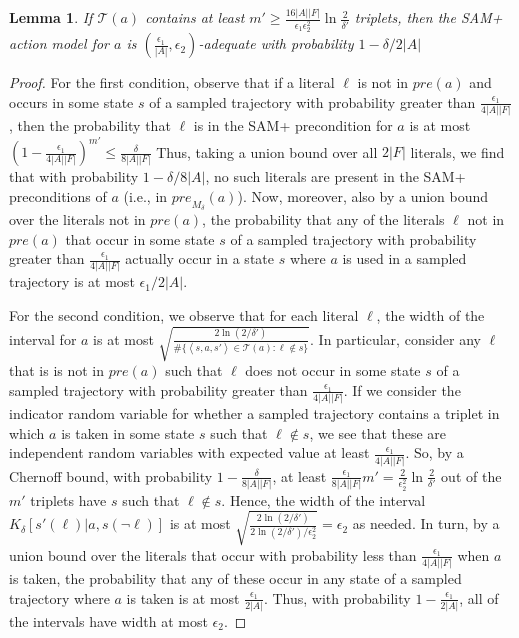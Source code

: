 \documentclass[letterpaper]{article} %
\newtheorem{lemma}{Lemma}
\newcommand{\pre}{\textit{pre}}
\newcommand{\tuple}[1]{\ensuremath{\left \langle #1 \right \rangle }}
\begin{document}
\begin{lemma}\label{lem:sam-adequate}
If $\mathcal{T}(a)$ contains at least
$
m' \geq \frac{16|A||F|}{\epsilon_1\epsilon_2^2}\ln\frac{2}{\delta'}
$
triplets, then the SAM+ action model for $a$ is
$(\frac{\epsilon_1}{|A|},\epsilon_2)$-adequate with probability $1-\delta/2|A|$
\end{lemma}
\begin{proof}
For the first condition, observe that if a literal $\ell$ is not in $\pre(a)$ and occurs in some state $s$ of a sampled trajectory with probability greater than $\frac{\epsilon_1}{4|A||F|}$, then the probability that $\ell$ is in the SAM+ precondition for $a$ is at most
$
(1-\frac{\epsilon_1}{4|A||F|})^{m'}\leq \frac{\delta}{8|A||F|}
$
Thus, taking a union bound over all $2|F|$ literals, we find that with probability $1-\delta/8|A|$, no such literals are present in the SAM+ preconditions of $a$ (i.e., in $\pre_{M_\delta}(a)$). Now, moreover, also by a union bound over the literals not in $\pre(a)$, the probability that any of the literals $\ell$ not in $\pre(a)$ that occur in some state $s$ of a sampled trajectory with probability greater than $\frac{\epsilon_1}{4|A||F|}$ actually occur in a state $s$ where $a$ is used in a sampled trajectory is at most $\epsilon_1/2|A|$.

For the second condition, we observe that for each literal $\ell$, the width of the interval for $a$ is at most $\sqrt{\frac{2\ln(2/\delta')}{\#\{\tuple{s, a, s'}\in \mathcal{T}(a):\ell\notin s\}}}$. In particular, consider any $\ell$ that is is not in $\pre(a)$ such that $\ell$ does not occur in some state $s$ of a sampled trajectory with probability greater than $\frac{\epsilon_1}{4|A||F|}$. If we consider the indicator random variable for whether a sampled trajectory contains a triplet in which $a$ is taken in some state $s$ such that $\ell\notin s$, we see that these are independent random variables with expected value at least $\frac{\epsilon_1}{4|A||F|}$. 
So, by a Chernoff bound, with probability $1-\frac{\delta}{8|A||F|}$, at least $\frac{\epsilon_1}{8|A||F|}m'=\frac{2}{\epsilon_2^2}\ln\frac{2}{\delta'}$ out of the $m'$ triplets have $s$ such that $\ell\notin s$. Hence, the width of the interval $K_\delta[s'(\ell)|a,s(\neg\ell)]$ is at most
$
\sqrt{\frac{2\ln(2/\delta')}{2\ln(2/\delta')/\epsilon_2^2}}=\epsilon_2
$
as needed. 
In turn, by a union bound over the literals that occur with probability less than $\frac{\epsilon_1}{4|A||F|}$ when $a$ is taken, the probability that any of these occur in any state of a sampled trajectory where $a$ is taken is at most $\frac{\epsilon_1}{2|A|}$. Thus, with probability $1-\frac{\epsilon_1}{2|A|}$, all of the intervals have width at most $\epsilon_2$.


\end{proof}
\end{document}
